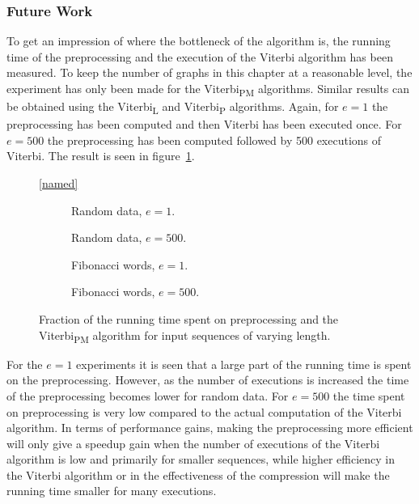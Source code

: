\subsubsection{Future Work}

To get an impression of where the bottleneck of the algorithm is, the running
time of the preprocessing and the execution of the Viterbi algorithm has been
measured. To keep the number of graphs in this chapter at a reasonable level,
the experiment has only been made for the Viterbi\textsubscript{PM} algorithms.
Similar results can be obtained using the Viterbi\textsubscript{L} and
Viterbi\textsubscript{P} algorithms. Again, for $e = 1$ the preprocessing has
been computed and then Viterbi has been executed once. For $e = 500$ the
preprocessing has been computed followed by 500 executions of Viterbi. The
result is seen in figure~\ref{fig:pre_vs_running}.

\begin{figure}
  \centering\ref{named}
  \begin{subfigure}{0.5\textwidth}
    \centering 
    \caption{Random data, $e = 1$.}
  \end{subfigure}%
  \begin{subfigure}{0.5\textwidth}
    \centering 
    \caption{Random data, $ e = 500$.}
  \end{subfigure}

  \begin{subfigure}{0.5\textwidth}
    \centering 
    \caption{Fibonacci words, $e = 1$.}
  \end{subfigure}%
  \begin{subfigure}{0.5\textwidth}
    \centering 
    \caption{Fibonacci words, $ e = 500$.}
  \end{subfigure}
  \caption{Fraction of the running time spent on preprocessing and the
    Viterbi\textsubscript{PM} algorithm for input sequences of varying length.}
  \label{fig:pre_vs_running}
\end{figure}

For the $e = 1$ experiments it is seen that a large part of the running time is
spent on the preprocessing. However, as the number of executions is increased
the time of the preprocessing becomes lower for random data. For $e = 500$ the
time spent on preprocessing is very low compared to the actual computation of
the Viterbi algorithm. In terms of performance gains, making the preprocessing
more efficient will only give a speedup gain when the number of executions of
the Viterbi algorithm is low and primarily for smaller sequences, while higher
efficiency in the Viterbi algorithm or in the effectiveness of the compression
will make the running time smaller for many executions.

